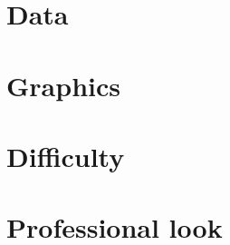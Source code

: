 \documentclass[11pt]{article}
\begin{document}
\vspace*{0.75in}



\section*{Data}

\vspace*{0.75in}



\section*{Graphics}

\vspace*{0.75in}


\section*{Difficulty}

\vspace*{0.75in}


\section*{Professional look}

\vspace*{0.75in}




\end{document}
